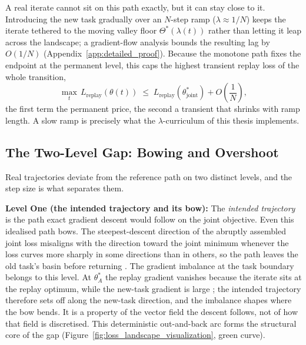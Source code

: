 A real iterate cannot sit on this path exactly, but it can stay close to it. Introducing the new task gradually over an $N$-step ramp ($\lambda \approx 1/N$) keeps the iterate tethered to the moving valley floor $\Theta^*(\lambda(t))$ rather than letting it leap across the landscape; a gradient-flow analysis bounds the resulting lag by $O(1/N)$ (Appendix~\ref{app:detailed_proof}). Because the monotone path fixes the endpoint at the permanent level, this caps the highest transient replay loss of the whole transition,
\begin{equation}
    \max_t\, L_{\text{replay}}(\theta(t)) \;\le\; L_{\text{replay}}(\theta_{\text{joint}}^*) + O\!\left(\frac{1}{N}\right),
    \label{eq:bound}
\end{equation}
the first term the permanent price, the second a transient that shrinks with ramp length. A slow ramp is precisely what the $\lambda$-curriculum of this thesis implements.

\subsection{The Two-Level Gap: Bowing and Overshoot}
\label{subsec:trajectory_problem}

Real trajectories deviate from the reference path on two distinct levels, and the step size is what separates them.

\textbf{Level One (the intended trajectory and its bow):} The \emph{intended trajectory} is the path exact gradient descent would follow on the joint objective. Even this idealised path bows. The steepest-descent direction of the abruptly assembled joint loss misaligns with the direction toward the joint minimum whenever the loss curves more sharply in some directions than in others, so the path leaves the old task's basin before returning \citep{kao2021naturalcontinuallearningsuccess}. The gradient imbalance at the task boundary belongs to this level. At $\theta_A^*$ the replay gradient vanishes because the iterate sits at the replay optimum, while the new-task gradient is large \citep{delange2023continualevaluationlifelonglearning}; the intended trajectory therefore sets off along the new-task direction, and the imbalance shapes where the bow bends. It is a property of the vector field the descent follows, not of how that field is discretised. This deterministic out-and-back arc forms the structural core of the gap (Figure~\ref{fig:loss_landscape_visualization}, green curve).

